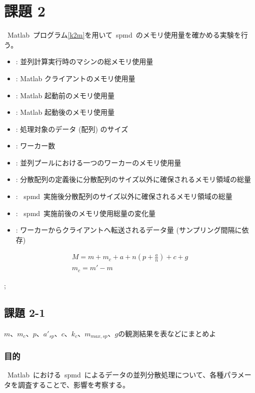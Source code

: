 \documentclass[10pt]{jarticle}
\begin{document}
\section{課題 2}
%

\ Matlab\ プログラム\ref{k2m}を用いて\ spmd\ のメモリ使用量を確かめる実験を行う。

\begin{itemize}[left=30pt]
\item[$M$]: 並列計算実行時のマシンの総メモリ使用量
\item[$m_{c}$]: Matlab クライアントのメモリ使用量
\item[$m$]: Matlab 起動前のメモリ使用量
\item[$m'$]: Matlab 起動後のメモリ使用量
\item[$a$]: 処理対象のデータ (配列) のサイズ
\item[$n$]: ワーカー数
\item[$p$]: 並列プールにおける一つのワーカーのメモリ使用量
\item[$a'_{sp}$]: 分散配列の定義後に分散配列のサイズ以外に確保されるメモリ領域の総量
\item[$c$]: \ spmd\ 実施後分散配列のサイズ以外に確保されるメモリ領域の総量
\item[$b$]: \ spmd\ 実施前後のメモリ使用総量の変化量
\item[$g$]: ワーカーからクライアントへ転送されるデータ量 (サンプリング間隔に依存)
\end{itemize}
\begin{gather}
	M = m + m_{c}+ a + n(p + \frac{a}{n}) + c + g \label{ga:21} \\
	m_{c}= m' - m \label{ga:22}
\end{gather}

;
%

\subsection{課題 2-1} \label{kadai:2-1}
$m、m_c、p、a'_{sp}、c、k_{c}、m_{max,sp}、g$の観測結果を表などにまとめよ
\subsubsection{目的}
%
\ Matlab\ における\ spmd\ によるデータの並列分散処理について、各種パラメータを調査することで、影響を考察する。
%
\end{document}
